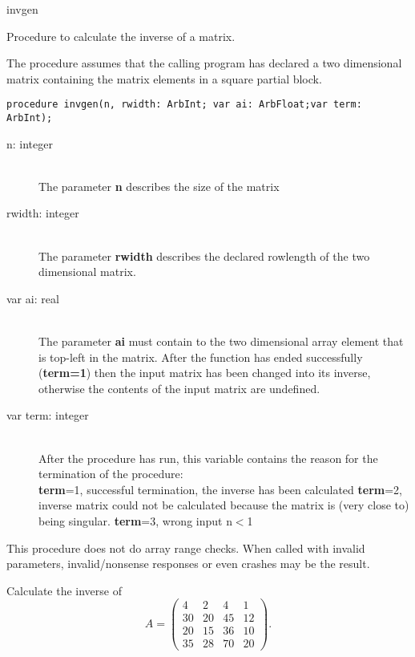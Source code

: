 \documentclass{report}
\newcommand{\FunctionDescription}{\item[Description]\rmfamily}
\newcommand{\Dataorganisation}{\item[Data Struct]\rmfamily}
\newcommand{\DeclarationandParams}{\item[Declaration]\rmfamily}
\newcommand{\Remarks}{\item[Remarks]\rmfamily}
\newcommand{\Example}{\item[Example]\rmfamily}
\begin{document}
\begin{procedure}{invgen}

\FunctionDescription

Procedure to calculate the inverse of a matrix.

\Dataorganisation

The procedure assumes that the calling program has declared a two
dimensional matrix containing the matrix elements in a square
partial block.

\DeclarationandParams

\lstinline|procedure invgen(n, rwidth: ArbInt; var ai: ArbFloat;var term: ArbInt);|

\begin{description}
 \item[n: integer] \mbox{ } \\
    The parameter {\bf n} describes the size of the matrix
 \item[rwidth: integer] \mbox{} \\
    The parameter {\bf rwidth} describes the declared rowlength of the two dimensional
    matrix.
 \item[var ai: real] \mbox{} \\
    The parameter {\bf ai} must contain to the two dimensional array element
    that is top-left in the matrix.
    After the function has ended successfully (\textbf{term=1}) then
    the input matrix has been changed into its inverse, otherwise the contents 
    of the input matrix are undefined.
 \item[var term: integer]  \mbox{} \\
    After the procedure has run, this variable contains the reason for 
    the termination of the procedure:\\
      {\bf term}=1, successful termination, the inverse has been calculated
      {\bf term}=2, inverse matrix could not be calculated because the matrix
		    is (very close to) being singular.
      {\bf term}=3, wrong input n$<$1
\end{description}
\Remarks
  This procedure does not do array range checks. When called with invalid
  parameters, invalid/nonsense responses or even crashes may be the result.

\Example

Calculate the inverse of 
\[
 A=
 \left(
 \begin{array}{rrrr}
   4 & 2 & 4 & 1  \\
  30 & 20 & 45 & 12 \\
  20 & 15 & 36 & 10 \\
  35 & 28 & 70 & 20
 \end{array}
 \right)
 .
\]


\end{procedure}
\end{document}
